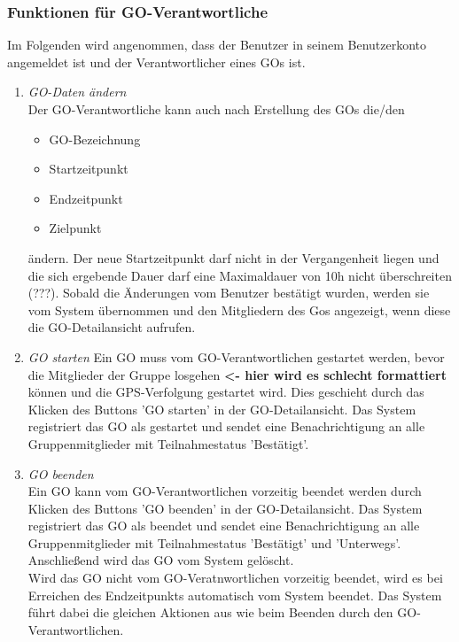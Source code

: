 \documentclass[parskip=full]{scrartcl}
\def\threedigits#1{%
  \ifnum#1<100 0\fi
  \ifnum#1<10 0\fi
  \number#1}
\begin{document}
\subsubsection{Funktionen für GO-Verantwortliche}
Im Folgenden wird angenommen, dass der Benutzer in seinem Benutzerkonto angemeldet ist und der Verantwortlicher eines GOs ist. %

\begin{enumerate}[label={\textbf{/F\protect\threedigits{\theenumi}0/}}, leftmargin=*, resume]	
	\item \textit{GO-Daten ändern} \\
	Der GO-Verantwortliche kann auch nach Erstellung des GOs die/den
	\begin{itemize}
		\item GO-Bezeichnung
		\item Startzeitpunkt
		\item Endzeitpunkt
		\item Zielpunkt
	\end{itemize}
	ändern. Der neue Startzeitpunkt darf nicht in der Vergangenheit liegen und die sich ergebende Dauer darf eine Maximaldauer von 10h nicht überschreiten (???). Sobald die Änderungen vom Benutzer bestätigt wurden, werden sie vom System übernommen und den Mitgliedern des Gos angezeigt, wenn diese die GO-Detailansicht aufrufen.

	\item \textit{GO starten} Ein GO muss vom GO-Verantwortlichen gestartet werden, bevor die Mitglieder der Gruppe \gls{losgehen} \textbf{<- hier wird es schlecht formattiert} können und die GPS-Verfolgung gestartet wird. Dies geschieht durch das Klicken des Buttons 'GO starten' in der GO-Detailansicht. Das System registriert das GO als gestartet und sendet eine Benachrichtigung an alle Gruppenmitglieder mit Teilnahmestatus 'Bestätigt'.

	
	\item \textit{GO beenden} \\
	Ein GO kann vom GO-Verantwortlichen vorzeitig beendet werden durch Klicken des Buttons 'GO beenden' in der GO-Detailansicht. Das System registriert das GO als beendet und sendet eine Benachrichtigung an alle Gruppenmitglieder mit Teilnahmestatus 'Bestätigt' und 'Unterwegs'. Anschließend wird das GO vom System gelöscht. \\
	Wird das GO nicht vom GO-Veratnwortlichen vorzeitig beendet, wird es bei Erreichen des Endzeitpunkts automatisch vom System beendet. Das System führt dabei die gleichen Aktionen aus wie beim Beenden durch den GO-Verantwortlichen.
\end{enumerate}
\end{document}
